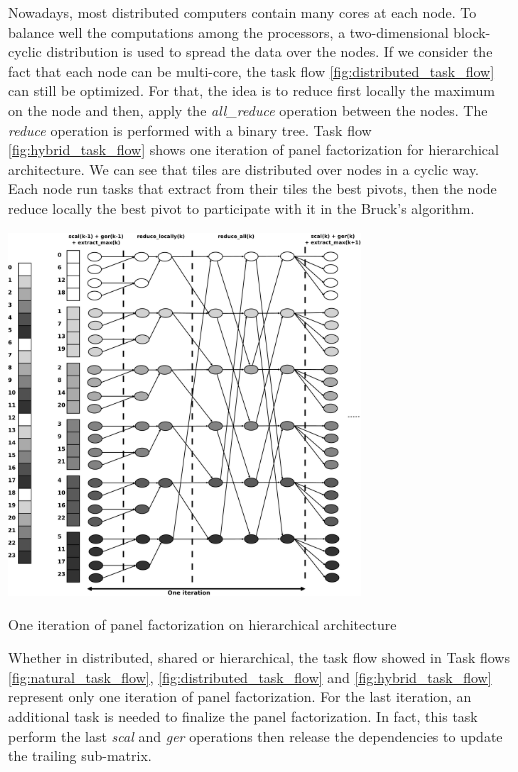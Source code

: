 Nowadays, most distributed computers contain many cores at each node. To balance well the computations among the processors, a two-dimensional block-cyclic distribution is used to spread the data over the nodes\cite{DGW:SHPCC92}.
If we consider the fact that each node can be multi-core, the task flow \ref{fig:distributed_task_flow} can still be optimized. For that, the idea is to reduce first locally the maximum on the node and then, apply the \emph{all\_reduce} operation between the nodes. The \emph{reduce} operation is performed with a binary tree. Task flow \ref{fig:hybrid_task_flow} shows one iteration of panel factorization for hierarchical architecture. We can see that tiles are distributed over nodes in a cyclic way. Each node run tasks that extract from their tiles the best pivots, then the node reduce locally the best pivot to participate with it in the Bruck's algorithm. 

\begin{taskflow}[!ht]
\centering
\includegraphics[width=0.7\textwidth]{figures/hybrid_tf_bw.pdf}
\caption{One iteration of panel factorization on hierarchical architecture \label{fig:hybrid_task_flow}}
\end{taskflow}
 
Whether in distributed, shared or hierarchical, the task flow showed in Task flows \ref{fig:natural_task_flow}, \ref{fig:distributed_task_flow} and \ref{fig:hybrid_task_flow} represent only one iteration of panel factorization. For the last iteration, an additional task is needed to finalize the panel factorization. In fact, this task perform the last \emph{scal} and \emph{ger} operations then release the dependencies to update the trailing sub-matrix.

